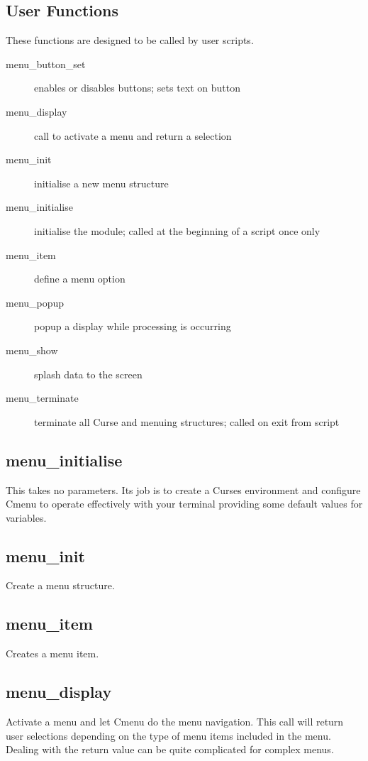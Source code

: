 \documentclass[a4paper,abstracton]{article}
\begin{document}
\subsection{User Functions}
These functions are designed to be called by user scripts.
\begin{description}
\item [menu\_button\_set] enables or disables buttons; sets text on button
\item [menu\_display] call to activate a menu and return a selection
\item [menu\_init] initialise a new menu structure
\item [menu\_initialise] initialise the module; called at the beginning of a script once only
\item [menu\_item] define a menu option
\item [menu\_popup] popup a display while processing is occurring
\item [menu\_show] splash data to the screen
\item [menu\_terminate] terminate all Curse and menuing structures; called on exit from script
\end{description}

\subsection{menu\_initialise}
This takes no parameters. Its job is to create a Curses environment and configure Cmenu to operate effectively with your terminal providing some default values for variables.

\subsection{menu\_init}
Create a menu structure.

\subsection{menu\_item}
Creates a menu item. 

\subsection{menu\_display} 
Activate a menu and let Cmenu do the menu navigation. This call will return user selections depending on the type of menu items included in the menu. Dealing with the return value can be quite complicated for complex menus.
\end{document}
